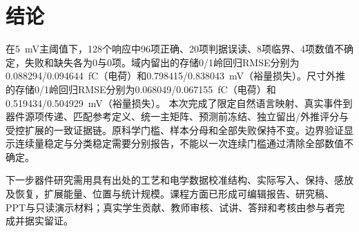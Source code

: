 \section{结论}
在5~mV主阈值下，128个响应中96项正确、20项判据误读、8项临界、4项数值不确定，失败和缺失各为0与0项。域内留出的存储0/1岭回归RMSE分别为0.088294/0.094644~fC（电荷）和0.798415/0.838043~mV（裕量损失）。尺寸外推的存储0/1岭回归RMSE分别为0.068049/0.067155~fC（电荷）和0.519434/0.504929~mV（裕量损失）。
本次完成了限定自然语言映射、真实事件到器件源项传递、匹配参考定义、统一主矩阵、预测前冻结、独立留出/外推评分与受控扩展的一致证据链。原科学门槛、样本分母和全部失败保持不变。边界验证显示连续量稳定与分类稳定需要分别报告，不能以一次连续门槛通过清除全部数值不确定。

下一步器件研究需用具有出处的工艺和电学数据校准结构、实际写入、保持、感放及恢复，扩展能量、位置与统计规模。课程方面已形成可编辑报告、研究稿、PPT与只读演示材料；真实学生贡献、教师审核、试讲、答辩和考核由参与者完成并据实留证。
